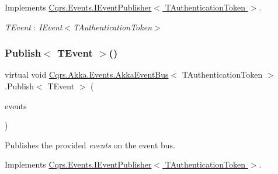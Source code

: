 Implements \hyperlink{interfaceCqrs_1_1Events_1_1IEventPublisher_a02f0db0bc9b3aa1c7f766f58f8422ee3_a02f0db0bc9b3aa1c7f766f58f8422ee3}{Cqrs.\+Events.\+I\+Event\+Publisher$<$ T\+Authentication\+Token $>$}.

\begin{Desc}
\item[Type Constraints]\begin{description}
\item[{\em T\+Event} : {\em I\+Event$<$T\+Authentication\+Token$>$}]\end{description}
\end{Desc}
\mbox{\label{classCqrs_1_1Akka_1_1Events_1_1AkkaEventBus_ad5b996dd77efbf51a2b5a32f94417772_ad5b996dd77efbf51a2b5a32f94417772}} 
\subsubsection{\texorpdfstring{Publish$<$ T\+Event $>$()}{Publish< TEvent >()}\hspace{0.1cm}{\footnotesize\ttfamily [2/2]}}
{\footnotesize\ttfamily virtual void \hyperlink{classCqrs_1_1Akka_1_1Events_1_1AkkaEventBus}{Cqrs.\+Akka.\+Events.\+Akka\+Event\+Bus}$<$ T\+Authentication\+Token $>$.Publish$<$ T\+Event $>$ (\begin{DoxyParamCaption}\item[{I\+Enumerable$<$ T\+Event $>$}]{events }\end{DoxyParamCaption})\hspace{0.3cm}{\ttfamily [virtual]}}



Publishes the provided {\itshape events}  on the event bus. 



Implements \hyperlink{interfaceCqrs_1_1Events_1_1IEventPublisher_a2cbcc3d2c24d015abef6337714ec51ff_a2cbcc3d2c24d015abef6337714ec51ff}{Cqrs.\+Events.\+I\+Event\+Publisher$<$ T\+Authentication\+Token $>$}.

